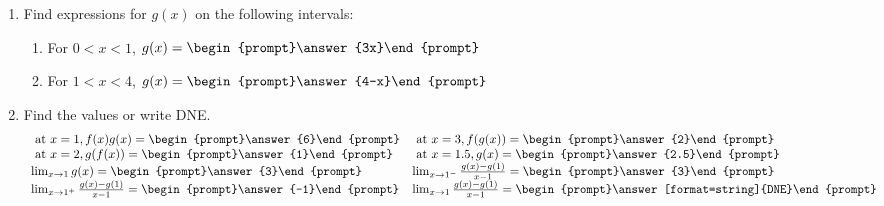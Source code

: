 \documentclass{ximera}
\begin{document}
\begin{exercise}
\begin{enumerate}
\item Find expressions for $g(x)$ on the following intervals:
\begin{enumerate}
\item For $0<x<1$, $g(x)=\begin{prompt}\answer{3x}\end{prompt}$
\item For $1<x<4$, $g(x)=\begin{prompt}\answer{4-x}\end{prompt}$
\end{enumerate}
\item Find the values or write DNE.
\[
\begin{array}{ l l l}
\text{ at } x=1,  f(x)g(x)= \begin{prompt}\answer{6}\end{prompt} &
\text{ at } x=3, f(g(x))= \begin{prompt}\answer{2}\end{prompt} \\
\text{ at } x=2, g(f(x))= \begin{prompt}\answer{1}\end{prompt} &
\text{ at } x=1.5, g(x)= \begin{prompt}\answer{2.5}\end{prompt} \\
\lim_{x\to 1} g(x)=\begin{prompt}\answer{3}\end{prompt} &
\lim_{x\to 1^-} \frac{g(x)-g(1)}{x-1}=\begin{prompt}\answer{3}\end{prompt}\\
\lim_{x\to 1^+} \frac{g(x)-g(1)}{x-1}=\begin{prompt}\answer{-1}\end{prompt} &
\lim_{x\to 1} \frac{g(x)-g(1)}{x-1}=\begin{prompt}\answer[format=string]{DNE}\end{prompt}
\end{array}
\]
\end{enumerate}
\end{exercise}

\end{document}
